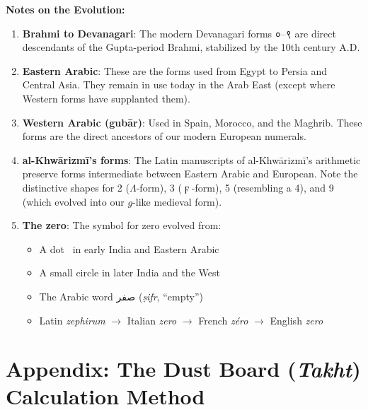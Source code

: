 \documentclass[11pt,a4paper]{article}
\newcommand{\ar}[1]{{\arabicfont #1}}
\newcommand{\dev}[1]{{\devanagarifont #1}}
\newenvironment{enhancednote}{%
  \begin{tcolorbox}[colback=enhancedbg,colframe=notecolor,boxrule=1pt,
    left=10pt,right=10pt,top=8pt,bottom=8pt,
    title={\textbf{Enhanced Edition Note}},fonttitle=\bfseries\color{notecolor}]
}{\end{tcolorbox}}
\begin{document}
\begin{enhancednote}
\textbf{Notes on the Evolution:}

\begin{enumerate}[leftmargin=1.5em,itemsep=2pt]
  \item \textbf{Brahmi to Devanagari}: The modern Devanagari forms \dev{०}--\dev{९} are direct descendants of the Gupta-period Brahmi, stabilized by the 10th century A.D.

  \item \textbf{Eastern Arabic}: These are the forms used from Egypt to Persia and Central Asia. They remain in use today in the Arab East (except where Western forms have supplanted them).

  \item \textbf{Western Arabic (gub\=ar)}: Used in Spain, Morocco, and the Maghrib. These forms are the direct ancestors of our modern European numerals.

  \item \textbf{al-Khw\=arizm\=i's forms}: The Latin manuscripts of al-Khw\=arizm\=i's arithmetic preserve forms intermediate between Eastern Arabic and European. Note the distinctive shapes for 2 ($\Lambda$-form), 3 ($\digamma$-form), 5 (resembling a 4), and 9 (which evolved into our $g$-like medieval form).

  \item \textbf{The zero}: The symbol for zero evolved from:
  \begin{itemize}[leftmargin=1em,itemsep=0pt]
    \item A dot \textperiodcentered\ in early India and Eastern Arabic
    \item A small circle in later India and the West
    \item The Arabic word \ar{صفر} (\textit{\d{s}ifr}, ``empty'')
    \item Latin \textit{zephirum} $\rightarrow$ Italian \textit{zero} $\rightarrow$ French \textit{z\'{e}ro} $\rightarrow$ English \textit{zero}
  \end{itemize}
\end{enumerate}
\end{enhancednote}

\newpage

\section*{Appendix: The Dust Board (\textit{Takht}) Calculation Method}
\end{document}
